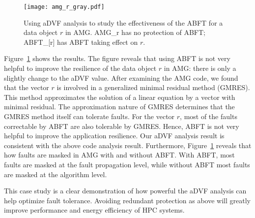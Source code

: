 \begin{figure}
	\centering
	\texttt{[image: amg\_r\_gray.pdf]}
	\caption{Using aDVF analysis to study the effectiveness of the ABFT for a data object $r$ in AMG. AMG\_r has no protection of ABFT; ABFT\_[r] has ABFT taking effect on $r$.}
	\label{fig:abft_advf_qbox}
    \vspace{-12pt}
\end{figure}

Figure~\ref{fig:abft_advf_qbox} shows the results. The figure reveals that using ABFT is not very helpful to improve
the resilience of the data object $r$ in AMG:
there is only a slightly change to the aDVF value.
After examining the AMG code, we found that the vector $r$ is involved in a generalized minimal residual method (GMRES).
This method approximates the solution
of a linear equation by a vector with minimal residual. 
The approximation nature of GMRES determines that the GMRES method itself can tolerate faults. 
For the vector $r$, most of the faults correctable by ABFT are also tolerable by GMRES.
Hence, ABFT is not very helpful to improve the application resilience.
Our aDVF analysis result is consistent with the above code analysis result.
Furthermore, Figure~\ref{fig:abft_advf_qbox} reveals that how faults are masked in AMG with and without ABFT. With ABFT,
most faults are masked at the fault propagation level, while without ABFT most faults are masked at the algorithm level. 

This case study is a clear demonstration of how powerful the aDVF analysis can help optimize
fault tolerance. Avoiding redundant protection as above will greatly improve performance and energy efficiency of HPC systems.
\vspace{-5pt}

